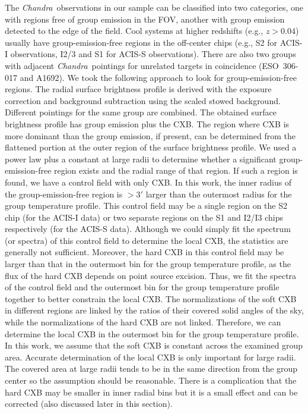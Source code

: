 \documentclass{aastex}
\def\chandra    {{\em Chandra}\/}
\begin{document}
The \chandra\ observations in our sample can be classified into two categories, one with
regions free of group emission in the FOV, another with group
emission detected to the edge of the field.
Cool systems at higher redshifts (e.g., $z > 0.04$) usually have group-emission-free
regions in the off-center chips (e.g., S2 for ACIS-I observations,
I2/3 and S1 for ACIS-S observations). There are also two groups with adjacent
\chandra\ pointings for unrelated targets in coincidence (ESO~306-017 and A1692).
We took the following approach to look for group-emission-free regions.
The radial surface brightness profile is derived with the exposure
correction and background subtraction using the scaled stowed background.
Different pointings for the same group are combined.
The obtained surface brightness profile has group emission plus the CXB.
The region where CXB is more dominant than the group emission, if present, can be
determined from the flattened portion at the outer region of the surface brightness profile.
We used a power law plus a constant at large radii to determine whether a significant
group-emission-free region exists and the radial range of that region.
If such a region is found, we have a control field with only CXB.
In this work, the inner radius of the group-emission-free region is
$> 3'$ larger than the outermost radius for the group temperature profile.
This control field may be a single region on the S2 chip (for the ACIS-I data)
or two separate regions on the S1 and I2/I3 chips respectively (for the ACIS-S
data). Although we could simply fit the spectrum (or spectra) of this control
field to determine the local CXB, the statistics are generally not sufficient. Moreover,
the hard CXB in this control field may be larger than that in the outermost
bin for the group temperature profile, as the flux of the hard CXB depends on
point source excision. Thus, we fit the spectra of the control field and the 
outermost bin for the group temperature profile together to better constrain the
local CXB. The normalizations of the soft CXB in different regions 
are linked by the ratios of their covered solid angles of the sky, while the normalizations
of the hard CXB are not linked. Therefore, we can determine the local CXB in the
outermost bin for the group temperature profile. In this work, we assume that the
soft CXB is constant across the examined group area.
Accurate determination of the local CXB is only important for large radii.
The covered area at large radii tends to be in the same direction
from the group center so the assumption should be reasonable. There is a complication
that the hard CXB may be smaller in inner radial bins but it is a small effect
and can be corrected (also discussed later in this section).
\end{document}
